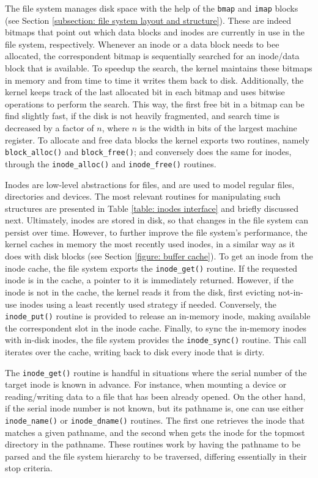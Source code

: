 \documentclass[10pt,a4paper]{article}
\begin{document}
The file system manages disk space with the help of the \texttt{bmap} and \texttt{imap} blocks (see Section \ref{subsection: file system layout and structure}). These are indeed bitmaps that point out which data blocks and inodes are currently in use in the file system, respectively. Whenever an inode or a data block needs to bee allocated, the correspondent bitmap is sequentially searched for an inode/data block that is available. To speedup the search, the kernel maintains these bitmaps in memory and from time to time it writes them back to disk. Additionally, the kernel keeps track of the last allocated bit in each bitmap and uses bitwise operations to perform the search. This way, the first free bit in a bitmap can be find slightly fast, if the disk is not heavily fragmented, and search time is decreased by a factor of $n$, where $n$ is the width in bits of the largest machine register. To allocate and free data blocks the kernel exports two routines, namely \texttt{block\_alloc()} and \texttt{block\_free()}; and conversely does the same for inodes, through the \texttt{inode\_alloc()} and \texttt{inode\_free()} routines.

Inodes are low-level abstractions for files, and are used to model regular files, directories and devices. The most relevant routines for manipulating such structures are presented in Table \ref{table: inodes interface} and briefly discussed next. Ultimately, inodes are stored in disk, so that changes in the file system can persist over time. However, to further improve the file system's performance, the kernel caches in memory the most recently used inodes, in a similar way as it does with disk blocks (see Section \ref{figure: buffer cache}). To get an inode from the inode cache, the file system exports the \texttt{inode\_get()} routine. If the requested inode is in the cache, a pointer to it is immediately returned. However, if the inode is not in the cache, the kernel reads it from the disk, first evicting not-in-use inodes using a least recently used strategy if needed. Conversely, the \texttt{inode\_put()} routine is provided to release an in-memory inode, making available the correspondent slot in the inode cache. Finally, to sync the in-memory inodes with in-disk inodes, the file system provides the \texttt{inode\_sync()} routine. This call iterates over the cache, writing back to disk every inode that is dirty.

The \texttt{inode\_get()} routine is handful in situations where the serial number of the target inode is known in advance. For instance, when mounting a device or reading/writing data to a file that has been already opened. On the other hand, if the serial inode number is not known, but its pathname is, one can use either \texttt{inode\_name()} or \texttt{inode\_dname()} routines. The first one retrieves the inode that matches a given pathname, and the second when gets the inode for the topmost directory in the pathname. These routines work by having the pathname to be parsed and the file system hierarchy to be traversed, differing essentially in their stop criteria.
\end{document}

